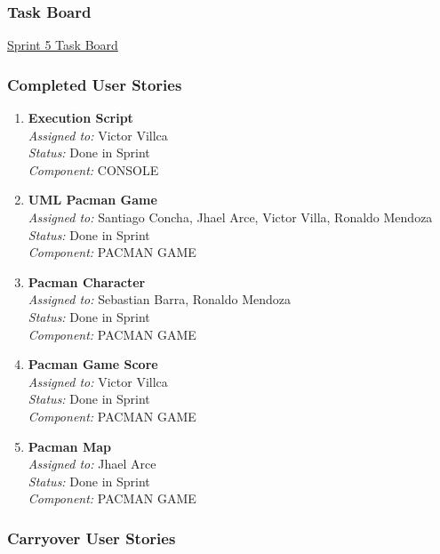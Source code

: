 \subsubsection*{Task Board}
\href{https://tree.taiga.io/project/joseluis-teran-coffeetime/taskboard/sprint-5-3817}{Sprint 5 Task Board}

\subsubsection*{Completed User Stories}

\begin{enumerate}
    \item \textbf{Execution Script} \\
    \textit{Assigned to:} Victor Villca \\
    \textit{Status:} Done in Sprint \\
    \textit{Component:} CONSOLE
    \item \textbf{UML Pacman Game} \\
    \textit{Assigned to:} Santiago Concha, Jhael Arce, Victor Villa, Ronaldo Mendoza \\
    \textit{Status:} Done in Sprint \\
    \textit{Component:} PACMAN GAME
    \item \textbf{Pacman Character} \\
    \textit{Assigned to:} Sebastian Barra, Ronaldo Mendoza \\
    \textit{Status:} Done in Sprint \\
    \textit{Component:} PACMAN GAME
    \item \textbf{Pacman Game Score} \\
    \textit{Assigned to:} Victor Villca \\
    \textit{Status:} Done in Sprint \\
    \textit{Component:} PACMAN GAME
    \item \textbf{Pacman Map} \\
    \textit{Assigned to:} Jhael Arce  \\
    \textit{Status:} Done in Sprint \\
    \textit{Component:} PACMAN GAME
\end{enumerate}

\subsubsection*{Carryover User Stories}

